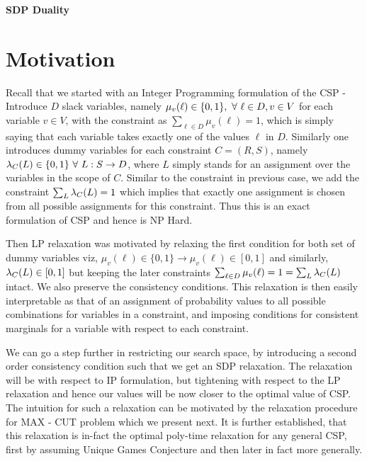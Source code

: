 \documentclass[12pt]{article}
\begin{document}
\begin{center}
\large \bf SDP Duality
\end{center}

\bigskip

%
%

\section{Motivation}

Recall that we started with an Integer Programming formulation of the CSP - Introduce $D$ slack variables, namely $\mu_v(\ell) \in \{ 0, 1 \}, \ \forall \  \ell \in D, v \in V $ for each variable $v \in V$, with the constraint as $\sum_{\ell  \in D} \mu_v(\ell) = 1$, which is simply saying that each variable takes exactly one of the values $\ell$ in $D$. 
Similarly one introduces dummy variables for each constraint $C=(R,S)$, namely $\lambda_C(L) \in \{ 0, 1\} \ \forall \  L : S \rightarrow D$, where $L$ simply stands for an assignment over the variables in the scope of $C$. 
Similar to the constraint in previous case, we add the constraint $\sum_L \lambda_C(L) = 1$ which implies that exactly one assignment is chosen from all possible assignments for this constraint.  
Thus this is an exact formulation of CSP and hence is NP Hard. 

Then LP relaxation was motivated by relaxing the first condition for both set of dummy variables viz, $\mu_v(\ell) \in \{ 0, 1\} \rightarrow \mu_v(\ell) \in [0, 1]$ and similarly, $\lambda_C(L) \in [0, 1]$ but keeping the later constraints $\sum_{\ell  \in D} \mu_v(\ell) = 1 = \sum_L \lambda_C(L)$ intact. 
We also preserve the consistency conditions. 
This relaxation is then easily interpretable as that of an assignment of probability values to all possible combinations for variables in a constraint, and imposing conditions for consistent marginals for a variable with respect to each constraint. 

We can go a step further in restricting our search space, by introducing a second order consistency condition such that we get an SDP relaxation. 
The relaxation will be with respect to IP formulation, but tightening with respect to the LP relaxation and hence our values will be now closer to the optimal value of CSP. 
The intuition for such a relaxation can be motivated by the relaxation procedure for MAX - CUT problem which we present next. 
It is further established, that this relaxation is in-fact the optimal poly-time relaxation for any general CSP, first by assuming Unique Games Conjecture and then later in fact more generally. 
\end{document}
